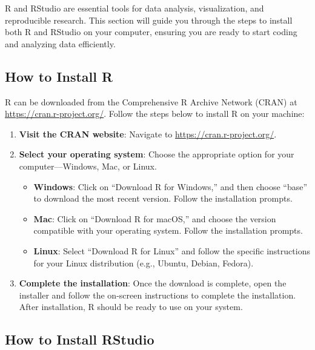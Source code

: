 \documentclass[
]{book}
\providecommand{\tightlist}{%
  \setlength{\itemsep}{0pt}\setlength{\parskip}{0pt}}
\begin{document}
R and RStudio are essential tools for data analysis, visualization, and reproducible research. This section will guide you through the steps to install both R and RStudio on your computer, ensuring you are ready to start coding and analyzing data efficiently.

\subsection*{How to Install R}\label{how-to-install-r}

R can be downloaded from the Comprehensive R Archive Network (CRAN) at \url{https://cran.r-project.org/}. Follow the steps below to install R on your machine:

\begin{enumerate}
\def\labelenumi{\arabic{enumi}.}
\tightlist
\item
  \textbf{Visit the CRAN website}: Navigate to \url{https://cran.r-project.org/}.
\item
  \textbf{Select your operating system}: Choose the appropriate option for your computer---Windows, Mac, or Linux.

  \begin{itemize}
  \tightlist
  \item
    \textbf{Windows}: Click on ``Download R for Windows,'' and then choose ``base'' to download the most recent version. Follow the installation prompts.
  \item
    \textbf{Mac}: Click on ``Download R for macOS,'' and choose the version compatible with your operating system. Follow the installation prompts.
  \item
    \textbf{Linux}: Select ``Download R for Linux'' and follow the specific instructions for your Linux distribution (e.g., Ubuntu, Debian, Fedora).
  \end{itemize}
\item
  \textbf{Complete the installation}: Once the download is complete, open the installer and follow the on-screen instructions to complete the installation. After installation, R should be ready to use on your system.
\end{enumerate}

\subsection*{How to Install RStudio}\label{how-to-install-rstudio}
\end{document}
